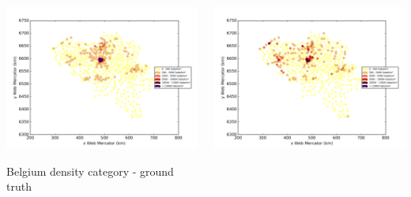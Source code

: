 \documentclass[c]{beamer}
\begin{document}
\begin{frame}
\begin{columns}
 \begin{column}{0.5\textwidth}
  \begin{overlayarea}{\linewidth}{4cm}
    \centering\vfill
    \includegraphics[scale=0.25]{../../data/Belgique/test/Nearest_Neighboors_Classification/Nearest_Neighboors_Classification/density_ground_truth.png}
  \end{overlayarea}
  \begin{overlayarea}{\linewidth}{0.5cm}
    \centering
    \tiny Belgium density category - ground truth\par
  \end{overlayarea}
 \end{column}
 \begin{column}{0.5\textwidth}
  \begin{overlayarea}{\linewidth}{4cm}
    \centering\vfill
    \includegraphics[scale=0.25]{../../data/Belgique/test/Nearest_Neighboors_Classification/Nearest_Neighboors_Classification/density_classification.png}

\end{overlayarea}
\end{column}
\end{columns}
\end{frame}
\end{document}
